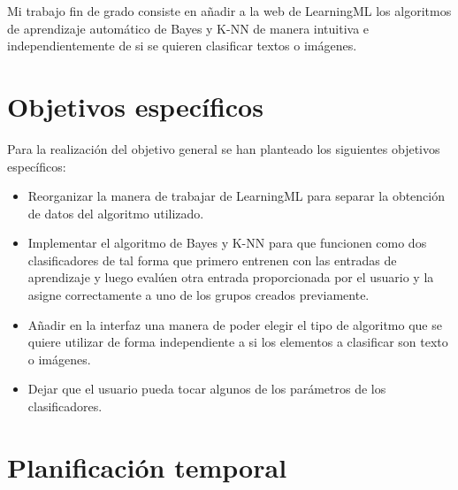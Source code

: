 \documentclass[a4paper, 12pt]{book}
\begin{document}
Mi trabajo fin de grado consiste en añadir a la web de LearningML los algoritmos de aprendizaje automático de Bayes y K-NN de manera intuitiva e independientemente de si se quieren clasificar textos o imágenes.

\section{Objetivos específicos}
\label{sec:objetivos-especificos}

Para la realización del objetivo general se han planteado los siguientes objetivos específicos:
\begin{itemize}
  
	\item Reorganizar la manera de trabajar de LearningML para separar la obtención de datos del algoritmo utilizado.
 
	\item Implementar el algoritmo de Bayes y K-NN para que funcionen como dos clasificadores de tal forma que primero entrenen con las entradas de aprendizaje y luego evalúen otra entrada proporcionada por el usuario y la asigne correctamente a uno de los grupos creados previamente.
  
	\item Añadir en la interfaz una manera de poder elegir el tipo de algoritmo que se quiere utilizar de forma independiente a si los elementos a clasificar son texto o imágenes.

	\item Dejar que el usuario pueda tocar algunos de los parámetros de los clasificadores.

\end{itemize}


\section{Planificación temporal}
\label{sec:planificacion-temporal}
\end{document}
